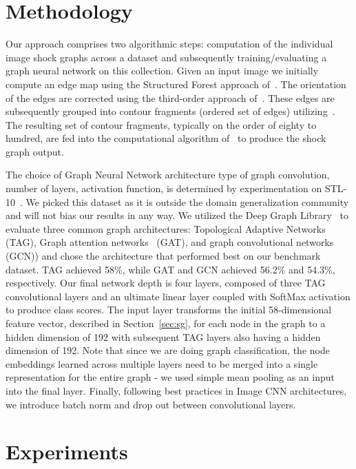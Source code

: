 \section{Methodology}

Our approach comprises two algorithmic steps: computation of the individual image shock graphs across a dataset and subsequently training/evaluating a graph neural network on this collection. Given an input image we initially compute an edge map using the Structured Forest approach of~\cite{Dollar:Zitnick:PAMI15}.  The orientation of the edges are corrected using the third-order approach of~\cite{Tamrakar:Kimia:ICCV07}. These edges are subsequently grouped into contour fragments (ordered set of edges) utilizing~\cite{Guo:etal:ECCV14}. The resulting set of contour fragments, typically on the order of eighty to hundred, are fed into the computational algorithm of~\cite{Tamrakar:Kimia:Shock} to produce the shock graph output.


The choice of Graph Neural Network architecture \ie type of graph convolution, number of layers, activation function, \etc is determined by experimentation on STL-10~\cite{Coates:etal:AISTATS11}. We picked this dataset as it is outside the domain generalization community and will not bias our results in any way. We utilized the Deep Graph Library~\cite{wang2019dgl} to evaluate three common graph architectures: Topological Adaptive Networks~\cite{Du:etal:CorR17} (TAG), Graph attention networks~\cite{Velickovic:etal:ICLR18} (GAT),  and graph convolutional networks~\cite{Kipf:Welling:ICLR17} (GCN)) and chose the architecture that performed best on our benchmark dataset. TAG achieved 58\%, while GAT  and GCN achieved 56.2\% and 54.3\%, respectively. Our final network depth is four layers, composed of three TAG convolutional layers and an ultimate linear layer coupled with SoftMax activation to produce class scores. The input layer transforms the initial 58-dimensional feature vector, described in Section~\ref{sec:sg}, for each node in the graph to a hidden dimension of 192 with subsequent TAG layers also having a hidden dimension of 192. Note that since we are doing graph classification, the node embeddings learned across multiple layers need to be merged into a single representation for the entire graph - we used simple mean pooling as an input into the final layer. Finally, following best practices in Image CNN architectures, we introduce batch norm and drop out between convolutional layers. 



\section{Experiments}




